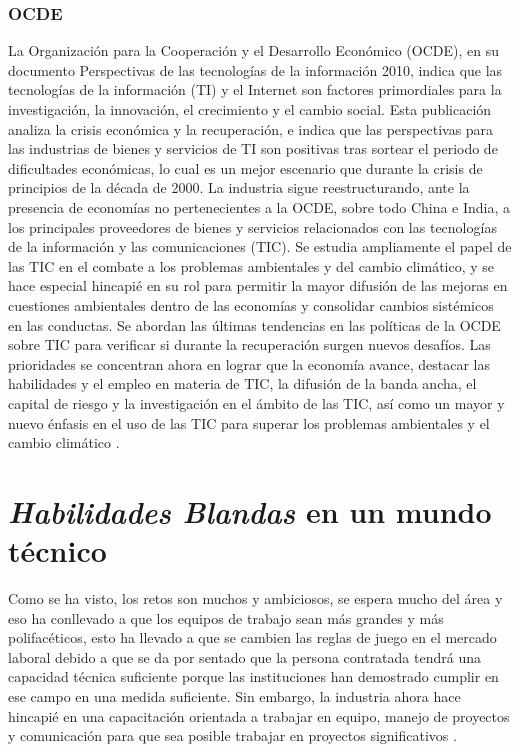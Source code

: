 \subsubsection{OCDE}
La Organización para la Cooperación y el Desarrollo Económico (OCDE), en su documento Perspectivas de las tecnologías de la información 2010, indica que las tecnologías de la información (TI) y el Internet son factores primordiales para la investigación, la innovación, el crecimiento y el cambio social. Esta publicación analiza la crisis económica y la recuperación, e indica que las perspectivas para las industrias de bienes y servicios de TI son positivas tras sortear el periodo de dificultades económicas, lo cual es un mejor escenario que durante la crisis de principios de la década de 2000. La industria sigue reestructurando, ante la presencia de economías no pertenecientes a la OCDE, sobre todo China e India, a los principales proveedores de bienes y servicios relacionados con las tecnologías de la información y las comunicaciones (TIC). Se estudia ampliamente el papel de las TIC en el combate a los problemas ambientales y del cambio climático, y se hace especial hincapié en su rol para permitir la mayor difusión de las mejoras en cuestiones ambientales dentro de las economías y consolidar cambios sistémicos en las conductas. Se abordan las últimas tendencias en las políticas de la OCDE sobre TIC para verificar si durante la recuperación surgen nuevos desafíos. Las prioridades se concentran ahora en lograr que la economía avance, destacar las habilidades y el empleo en materia de TIC, la difusión de la banda ancha, el capital de riesgo y la investigación en el ámbito de las TIC, así como un mayor y nuevo énfasis en el uso de las TIC para superar los problemas ambientales y el cambio climático \cite{oecd:2010,espacios:2018}.



\section{\textit{Habilidades Blandas} en un mundo técnico}

Como se ha visto, los retos son muchos y ambiciosos, se espera mucho del área y eso ha conllevado a que los equipos de trabajo sean más grandes y más polifacéticos, esto ha llevado a que se cambien las reglas de juego en el mercado laboral debido a que se da por sentado que la persona contratada tendrá una capacidad técnica suficiente porque las instituciones han demostrado cumplir en ese campo en una medida suficiente. Sin embargo, la industria ahora hace hincapié en una capacitación orientada a trabajar en equipo, manejo de proyectos y comunicación para que sea posible trabajar en proyectos significativos \cite{innova:2016,IEEEreferencias:Web1}.
\vspace{5mm}

